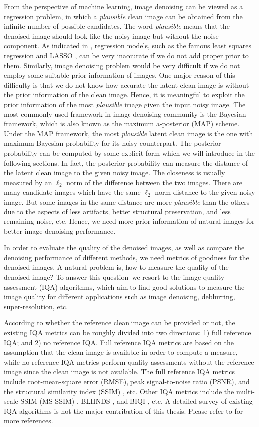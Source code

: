 From the perspective of machine learning, image denoising can be viewed as a regression problem, in which a \textsl{plausible} clean image can be obtained from the infinite number of possible candidates. The word \textsl{plausible} means that the denoised image should look like the noisy image but without the noise component. As indicated in \cite{Bishop}, regression models, such as the famous least squares regression and LASSO \cite{lasso}, can be very inaccurate if we do not add proper prior to them. Similarly, image denoising problem would be very difficult if we do not employ some suitable prior information of images. One major reason of this difficulty is that we do not know how accurate the latent clean image is without the prior information of the clean image. Hence, it is meaningful to exploit the prior information of the most \textsl{plausible} image given the input noisy image. The most commonly used framework in image denoising community is the Bayesian framework, which is also known as the maximum a-posterior (MAP) scheme. Under the MAP framework, the most \textsl{plausible} latent clean image is the one with maximum Bayesian probability for its noisy counterpart. The posterior probability can be computed by some explicit form which we will introduce in the following sections. In fact, the posterior probability can measure the distance of the latent clean image to the given noisy image. The closeness is usually measured by an $\ell_{2}$ norm of the difference between the two images. There are many candidate images which have the same $\ell_{2}$ norm distance to the given noisy image. But some images in the same distance are more \textsl{plausible} than the others due to the aspects of less artifacts, better structural preservation, and less remaining noise, etc. Hence, we need more prior information of natural images for better image denoising performance.


In order to evaluate the quality of the denoised images, as well as compare the denoising performance of different methods, we need metrics of goodness for the denoised images. A natural problem is, how to measure the quality of the denoised image? To answer this question, we resort to the image quality assessment (IQA) algorithms, which aim to find good solutions to measure the image quality for different applications such as image denoising, deblurring, super-resolution, etc. 

According to whether the reference clean image can be provided or not, the existing IQA metrics can be roughly divided into two directions: 1) full reference IQA; and 2) no reference IQA. Full reference IQA metrics are based on the assumption that the clean image is available in order to compute a measure, while no reference IQA metrics perform quality assessments without the reference image since the clean image is not available. The full reference IQA metrics include root-mean-square error (RMSE), peak signal-to-noise ratio (PSNR), and the structural similarity index (SSIM) \cite{ssim}, etc. Other IQA metrics include the multi-scale SSIM (MS-SSIM) \cite{msssim}, BLIINDS \cite{bliinds}, and BIQI \cite{biqi}, etc. A detailed survey of existing IQA algorithms is not the major contribution of this thesis. Please refer to \cite{ssim} for more references. 

